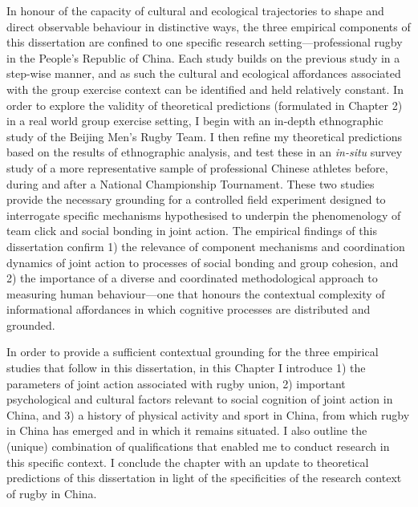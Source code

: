In honour of the capacity of cultural and ecological trajectories to shape and direct observable behaviour in distinctive ways, the three empirical components of this dissertation are confined to one specific research setting---professional rugby in the People's Republic of China. Each study builds on the previous study in a step-wise manner, and as such the cultural and ecological affordances associated with the group exercise context can be identified and held relatively constant.  In order to explore the validity of theoretical predictions (formulated in Chapter 2) in a real world group exercise setting,  I begin with an in-depth ethnographic study of the Beijing Men's Rugby Team.  I then refine my theoretical predictions based on the results of ethnographic analysis, and test these in an \textit{in-situ} survey study of a more representative sample of professional Chinese athletes before, during and after a National Championship Tournament.  These two studies provide the necessary grounding for a controlled field experiment designed to interrogate specific mechanisms hypothesised to underpin the phenomenology of team click and social bonding in joint action.  The empirical findings of this dissertation confirm 1) the relevance of component mechanisms and coordination dynamics of joint action to processes of social bonding and group cohesion, and 2) the importance of a diverse and coordinated methodological approach to measuring human behaviour---one that honours the contextual complexity of informational affordances in which cognitive processes are distributed and grounded.

In order to provide a sufficient contextual grounding for the three empirical studies that follow in this dissertation, in this Chapter I introduce 1) the parameters of joint action associated with rugby union, 2) important psychological and cultural factors relevant to social cognition of joint action in China, and 3) a history of physical activity and sport in China, from which rugby in China has emerged and in which it remains situated. I also outline the (unique) combination of qualifications that enabled me to conduct research in this specific context.  I conclude the chapter with an update to theoretical predictions of this dissertation in light of the specificities of the research context of rugby in China.


